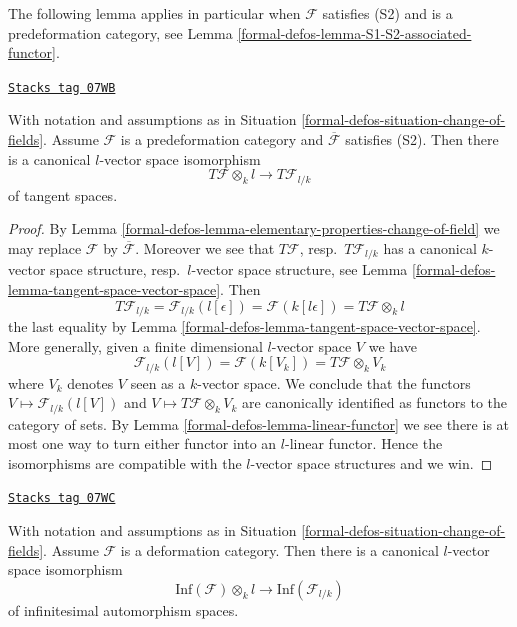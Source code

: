 The following lemma applies in particular when $\mathcal{F}$
satisfies (S2) and is a predeformation category, see
Lemma \ref{formal-defos-lemma-S1-S2-associated-functor}.

\begin{lemma}
\label{formal-defos-lemma-tangent-space-change-of-field}
\href{https://stacks.math.columbia.edu/tag/07WB}{\texttt{Stacks tag 07WB}}

With notation and assumptions as in Situation \ref{formal-defos-situation-change-of-fields}.
Assume $\mathcal{F}$ is a predeformation category and
$\overline{\mathcal{F}}$ satisfies (S2). Then there is a
canonical $l$-vector space isomorphism
$$
T\mathcal{F} \otimes_k l \longrightarrow T\mathcal{F}_{l/k}
$$
of tangent spaces.
\end{lemma}

\begin{proof}
By Lemma \ref{formal-defos-lemma-elementary-properties-change-of-field} we may replace
$\mathcal{F}$ by $\overline{\mathcal{F}}$. Moreover we see that
$T\mathcal{F}$, resp.\ $T\mathcal{F}_{l/k}$ has a canonical
$k$-vector space structure, resp.\ $l$-vector space structure, see
Lemma \ref{formal-defos-lemma-tangent-space-vector-space}. Then
$$
T\mathcal{F}_{l/k} = \mathcal{F}_{l/k}(l[\epsilon])
= \mathcal{F}(k[l\epsilon]) = T\mathcal{F} \otimes_k l
$$
the last equality by Lemma \ref{formal-defos-lemma-tangent-space-vector-space}.
More generally, given a finite dimensional $l$-vector space $V$ we have
$$
\mathcal{F}_{l/k}(l[V]) = \mathcal{F}(k[V_k]) = T\mathcal{F} \otimes_k V_k
$$
where $V_k$ denotes $V$ seen as a $k$-vector space. We conclude that
the functors $V \mapsto \mathcal{F}_{l/k}(l[V])$ and
$V \mapsto T\mathcal{F} \otimes_k V_k$ are canonically identified
as functors to the category of sets. By Lemma \ref{formal-defos-lemma-linear-functor}
we see there is at most one way to turn either functor into an $l$-linear
functor. Hence the isomorphisms are compatible with the $l$-vector space
structures and we win.
\end{proof}

\begin{lemma}
\label{formal-defos-lemma-inf-aut-change-of-field}
\href{https://stacks.math.columbia.edu/tag/07WC}{\texttt{Stacks tag 07WC}}

With notation and assumptions as in Situation \ref{formal-defos-situation-change-of-fields}.
Assume $\mathcal{F}$ is a deformation category.
Then there is a
canonical $l$-vector space isomorphism
$$
\text{Inf}(\mathcal{F}) \otimes_k l
\longrightarrow
\text{Inf}(\mathcal{F}_{l/k})
$$
of infinitesimal automorphism spaces.
\end{lemma}

